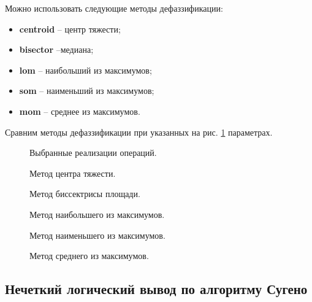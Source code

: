 			Можно использовать следующие методы дефаззификации:
			\begin{itemize}
				\item	\textbf{centroid} – центр тяжести;
				\item	\textbf{bisector} –медиана;
				\item	\textbf{lom} – наибольший из максимумов;
				\item	\textbf{som} – наименьший из максимумов;
				\item	\textbf{mom} – среднее из максимумов.
			\end{itemize}
			
			Сравним методы дефаззификации при указанных на рис. \ref{params} параметрах.
			\begin{figure}[h!]
				\caption{Выбранные реализации операций.}
				\label{params}
			\end{figure}
			
			
			\begin{figure}[h!]
				\caption{Метод центра тяжести.}
			\end{figure}
		
			\begin{figure}[h!]
				\caption{Метод биссектрисы площади.}
			\end{figure}
			
			\begin{figure}[h!]
				\caption{Метод наибольшего из максимумов.}
			\end{figure}
		
			\begin{figure}[h!]
				\caption{Метод наименьшего из максимумов.}
			\end{figure}
			
			\begin{figure}[h!]
				\caption{Метод среднего из максимумов.}
			\end{figure}
		
		\FloatBarrier
		\clearpage
		
		\subsection{Нечеткий логический вывод по алгоритму Сугено}
		
